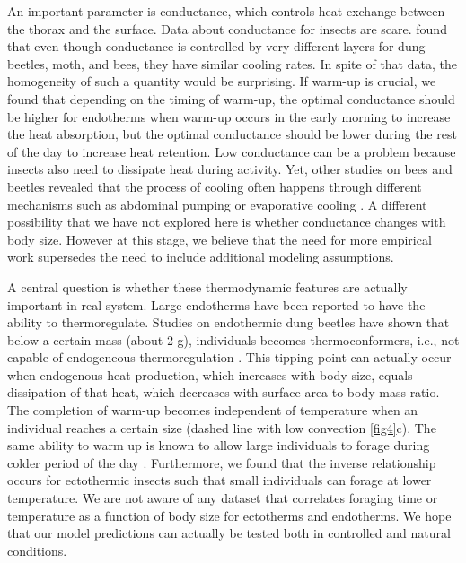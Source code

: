 An important parameter is conductance, which controls heat exchange between the thorax and the surface.
Data about conductance for insects are scare.
\citet{Bartholomew1978} found that even though conductance is controlled by very different layers for dung beetles, moth, and bees, they have similar cooling rates. %
In spite of that data, the homogeneity of such a quantity would be surprising. %
If warm-up is crucial, we found that depending on the timing of warm-up, the optimal conductance should be higher for endotherms when warm-up occurs in the early morning  to increase the heat absorption, but the optimal conductance should be lower during the rest of the day to increase heat retention.
Low conductance  can be a problem because insects also need to dissipate heat during activity.
Yet, other studies on bees and beetles revealed that the process of cooling often happens through different mechanisms such as abdominal pumping or evaporative cooling \citep{Heinrich1979, Verdu2012}.
A different possibility that we have not explored here is whether conductance changes with body size.
However at this stage, we believe that the need for more empirical work supersedes the need to include additional modeling assumptions.

A central question is whether these thermodynamic features are actually important in real system.  
Large endotherms have been reported to have the ability to thermoregulate. 
Studies on endothermic dung beetles have shown that below a certain mass (about 2 g), individuals becomes thermoconformers, i.e., not capable of endogeneous thermoregulation \citep{Bartholomew1978, Verdu2006}. 
This tipping point can actually occur when endogenous heat production, which increases with body size, equals dissipation of that heat, which decreases with surface area-to-body mass ratio.
The completion of warm-up becomes independent of temperature when an individual reaches a certain size (dashed line with low convection \cref{fig4}c).
The same ability to warm up is known to allow large individuals to forage during colder period of the day \citep{May1985}.
Furthermore, we found that the inverse relationship occurs for ectothermic insects such that small individuals can forage at lower temperature.
We are not aware of any dataset that correlates foraging time or temperature as a function of body size for ectotherms and endotherms.
We hope that our model predictions can actually be tested both in controlled and natural conditions. 


